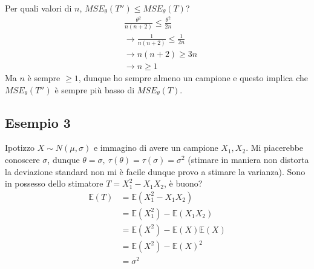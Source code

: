 \documentclass[11pt]{report}
\begin{document}
Per quali valori di $n$, $MSE_\theta(T'') \leq MSE_\theta(T)$?
\begin{equation}
    \begin{split}
        & \frac{\theta^2}{n(n+2)} \leq \frac{\theta^2}{2n}\\
        & \rightarrow \frac{1}{n(n+2)} \leq \frac{1}{2n}\\
        & \rightarrow n(n+2) \geq 3n\\
        & \rightarrow n \geq 1
    \end{split}
\end{equation}
Ma $n$ è sempre $ \geq 1$, dunque ho sempre almeno un campione e questo implica che $MSE_\theta(T'')$ è sempre più basso di $MSE_\theta(T)$.
\subsection{Esempio 3}
Ipotizzo $X \sim N(\mu, \sigma)$ e immagino di avere un campione $X_1, X_2$. Mi piacerebbe conoscere $\sigma$, dunque $\theta = \sigma,\ \tau(\theta) = \tau(\sigma) = \sigma^2$ (stimare in maniera non distorta la deviazione standard non mi è facile dunque provo a stimare la varianza). Sono in possesso dello stimatore $T = X_1^2 - X_1X_2$, è buono?
\begin{equation}
    \begin{split}
        \mathbb{E}(T) & = \mathbb{E}(X_1^2 - X_1X_2)\\
        & = \mathbb{E}(X_1^2) - \mathbb{E}(X_1X_2)\\
        & = \mathbb{E}(X^2) - \mathbb{E}(X)\mathbb{E}(X)\\
        & = \mathbb{E}(X^2) - \mathbb{E}(X)^2\\
        & = \sigma^2
    \end{split}
\end{equation}
\end{document}
